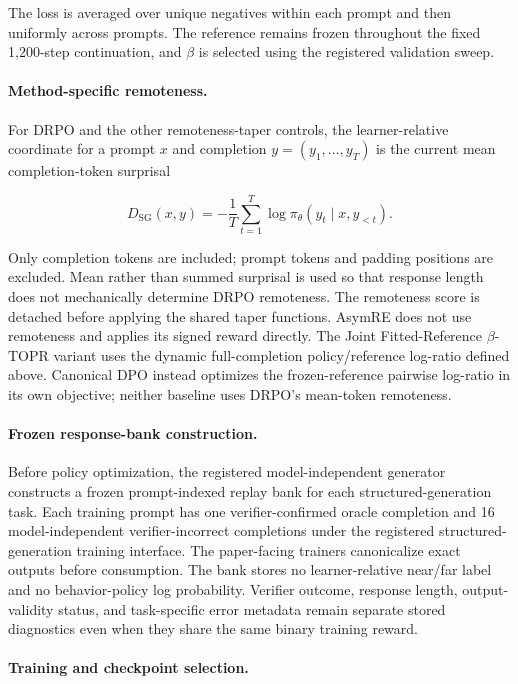 \documentclass{article}
\theoremstyle{plain}
\theoremstyle{definition}
\theoremstyle{remark}
\begin{document}
The loss is averaged over unique negatives within each prompt and then
uniformly across prompts. The reference remains frozen throughout the
fixed 1,200-step continuation, and \(\beta\) is selected using the
registered validation sweep.

\paragraph{Method-specific remoteness.}

For DRPO and the other remoteness-taper controls, the learner-relative
coordinate for a prompt \(x\) and completion
\(y=(y_1,\ldots,y_T)\) is the current mean completion-token surprisal

\[
D_{\mathrm{SG}}(x,y)
=
-\frac{1}{T}
\sum_{t=1}^{T}
\log
\pi_\theta
\left(
y_t\mid x,y_{<t}
\right).
\]

Only completion tokens are included; prompt tokens and padding positions
are excluded. Mean rather than summed surprisal is used so that response
length does not mechanically determine DRPO remoteness. The remoteness
score is detached before applying the shared taper functions. AsymRE
does not use remoteness and applies its signed reward directly. The
Joint Fitted-Reference \(\beta\)-TOPR variant uses the dynamic
full-completion policy/reference log-ratio defined above. Canonical DPO
instead optimizes the frozen-reference pairwise log-ratio in its own
objective; neither baseline uses DRPO's mean-token remoteness.

\paragraph{Frozen response-bank construction.}

Before policy optimization, the registered model-independent generator
constructs a frozen prompt-indexed replay bank for each
structured-generation task. Each training prompt has one verifier-confirmed
oracle completion and 16 model-independent verifier-incorrect completions
under the registered structured-generation training interface. The
paper-facing trainers canonicalize exact outputs before consumption. The
bank stores no learner-relative near/far label and no behavior-policy log
probability. Verifier outcome, response length, output-validity status, and
task-specific error metadata remain separate stored diagnostics even when
they share the same binary training reward.

\paragraph{Training and checkpoint selection.}
\end{document}
